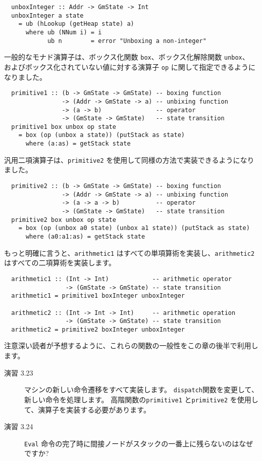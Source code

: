 \documentclass{jarticle}
\begin{document}
\begin{verbatim}
  unboxInteger :: Addr -> GmState -> Int
  unboxInteger a state
    = ub (hLookup (getHeap state) a)
      where ub (NNum i) = i
            ub n        = error "Unboxing a non-integer"
\end{verbatim}

一般的なモナド演算子は、ボックス化関数 \texttt{box}、ボックス化解除関数 \texttt{unbox}、
およびボックス化されていない値に対する演算子 \texttt{op} に関して指定できるようになりました。

\begin{verbatim}
  primitive1 :: (b -> GmState -> GmState) -- boxing function
                -> (Addr -> GmState -> a) -- unbixing function
                -> (a -> b)               -- operator
                -> (GmState -> GmState)   -- state transition
  primitive1 box unbox op state
    = box (op (unbox a state)) (putStack as state)
      where (a:as) = getStack state
\end{verbatim}

汎用二項演算子は、\texttt{primitive2} を使用して同様の方法で実装できるようになりました。

\begin{verbatim}
  primitive2 :: (b -> GmState -> GmState) -- boxing function
                -> (Addr -> GmState -> a) -- unbixing function
                -> (a -> a -> b)          -- operator
                -> (GmState -> GmState)   -- state transition
  primitive2 box unbox op state
    = box (op (unbox a0 state) (unbox a1 state)) (putStack as state)
      where (a0:a1:as) = getStack state
\end{verbatim}

もっと明確に言うと、\texttt{arithmetic1} はすべての単項算術を実装し、\texttt{arithmetic2} はすべての二項算術を実装します。

\begin{verbatim}
  arithmetic1 :: (Int -> Int)            -- arithmetic operator
                 -> (GmState -> GmState) -- state transition
  arithmetic1 = primitive1 boxInteger unboxInteger

  arithmetic2 :: (Int -> Int -> Int)     -- arithmetic operation
                 -> (GmState -> GmState) -- state transition
  arithmetic2 = primitive2 boxInteger unboxInteger
\end{verbatim}

注意深い読者が予想するように、これらの関数の一般性をこの章の後半で利用します。

\begin{description}
	\item[演習 3.23] マシンの新しい命令遷移をすべて実装します。
		\texttt{dispatch}関数を変更して、新しい命令を処理します。
		高階関数の\texttt{primitive1} と\texttt{primitive2} を使用して、演算子を実装する必要があります。
	\item[演習 3.24] \texttt{Eval} 命令の完了時に間接ノードがスタックの一番上に残らないのはなぜですか?
\end{description}
\end{document}
